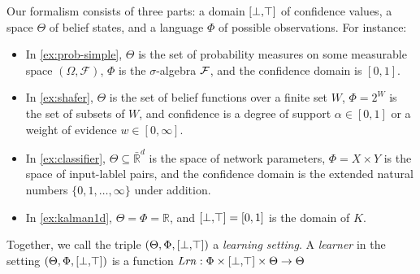 Our formalism consists of three parts: 
	a domain $[\bot,\!\top]$ of confidence values,
	a space $\Theta$ of belief states, and
	a language $\Phi$ of possible observations. 
For instance:
\begin{itemize}[nosep,itemsep=1pt,left=0.5em]
    \item In \cref{ex:prob-simple}, $\Theta$ is the set of probability
    measures on some measurable space $(\Omega, \mathcal F)$,
    $\Phi$ is the $\sigma$-algebra $\cal F$, and the confidence domain
    is $[0,1]$.
    \item In \cref{ex:shafer}, $\Theta$ is the set of belief functions
    over a finite set $W$, $\Phi = 2^W$ is the set of subsets of $W$,
    and confidence is a degree of support $\alpha \in [0,1]$
    or a weight of evidence $w \in [0,\infty]$.
    \item In \cref{ex:classifier}, 
	$\Theta \subseteq \bar{\mathbb R}^d$ is
    the space of network parameters, $\Phi = X \times Y$ is the space of 
    input-lablel pairs, and the confidence domain is the
	 	extended natural numbers $\{0, 1,\ldots, \infty\}$ under addition.
	\item In \cref{ex:kalman1d}, $\Theta = \Phi = \mathbb R$, and $[\bot,\!\top] = [0,1]$ is the domain of $K$. 
\end{itemize}
Together, we call the triple $(\Theta, \Phi, [\bot,\!\top])$ a \emph{learning setting}.
A \emph{learner} in the
setting $(\Theta, \Phi, [\bot,\!\top])$
is a function
$
	\mathit{Lrn} : \Phi \times [\bot,\!\top] \times \Theta \to \Theta
$
